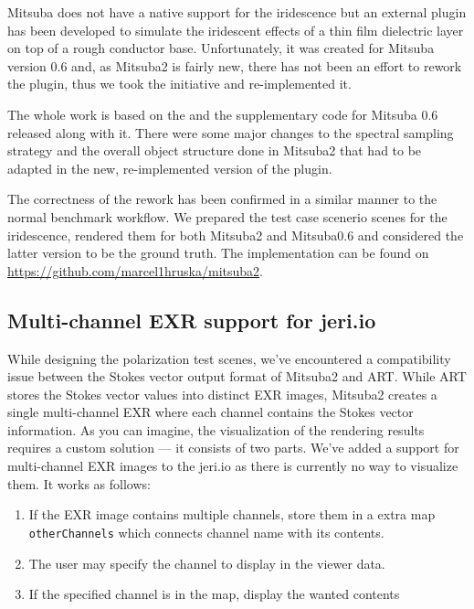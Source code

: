 Mitsuba does not have a native support for the iridescence but an external plugin has been developed to simulate the iridescent effects of a thin film dielectric layer on top of a rough conductor base. Unfortunately, it was created for Mitsuba version 0.6 and, as Mitsuba2 is fairly new, there has not been an effort to rework the plugin, thus we took the initiative and re-implemented it.

The whole work is based on the \citet{belcour2017practical} and the supplementary code for Mitsuba 0.6 released along with it.
There were some major changes to the spectral sampling strategy and the overall object structure done in Mitsuba2 that had to be adapted in the new, re-implemented version of the plugin.

The correctness of the rework has been confirmed in a similar manner to the normal benchmark workflow. We prepared the test case scenerio scenes for the iridescence, rendered them for both Mitsuba2 and Mitsuba0.6 and considered the latter version to be the ground truth. The implementation can be found on \url{https://github.com/marcel1hruska/mitsuba2}.

\subsection{Multi-channel EXR support for jeri.io}

While designing the polarization test scenes, we've encountered a compatibility issue between the Stokes vector output format of Mitsuba2 and ART. While ART stores the Stokes vector values into distinct EXR images, Mitsuba2 creates a single multi-channel EXR where each channel contains the Stokes vector information. As you can imagine, the visualization of the rendering results requires a custom solution --- it consists of two parts. We've added a support for multi-channel EXR images to the jeri.io as there is currently no way to visualize them. It works as follows:

\begin{enumerate}
	\item If the EXR image contains multiple channels, store them in a extra map \texttt{otherChannels} which connects channel name with its contents.
	\item The user may specify the channel to display in the viewer data.
	\item If the specified channel is in the map, display the wanted contents
\end{enumerate}


